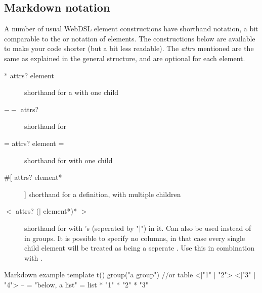 \subsection{Markdown notation}
A number of usual WebDSL element constructions have shorthand notation, a bit comparable to the  or  notation of  elements. The constructions below are available to make your code shorter (but a bit less readable). The \emph{attrs} mentioned  are the same as explained in the general structure, and are optional for each element. 
\begin{description}
	\item[* attrs? element]\ii{*} shorthand for a  with one child
	\item[$--$ attrs?]\ii{$--$} shorthand for 
	\item[= attrs? element =]\ii{= \ldots =} shorthand for  with one child
	\item[\#[ attrs? element* ]]\ii{\#[\ldots]} shorthand for a  definition, with multiple children
	\item[$<$ attrs? ($|$ element*)* $>$]
		\ii{$< | \ldots\ > $}
		\ii{$< \ldots\ >$}
		\ii{$ | \ldots\ $}
		 shorthand for  with 's (seperated by "$|$") in it. Can also be used instead of  in groups. It is possible to specify no columns, in that case every single child element will be treated as being a seperate . Use this in combination with .
\end{description}
\begin{webdsl}{Markdown example}
template t() {
	group("a group") { //or table
		<|"1" | "2">
		<|"3" | "4">
	}  
	--
	= "below, a list" =
	list {
		* "1"
		* "2"
		* "3"
	}
}
\end{webdsl}
